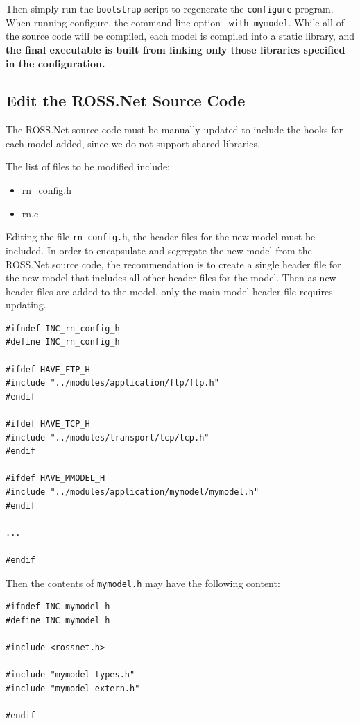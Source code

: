 \documentclass[conference,onecolumn]{IEEEtran}
\begin{document}
Then simply run the {\tt bootstrap} script to regenerate the {\tt configure} program.  When running configure, the command line option {\tt --with-mymodel}. While all of the source code will be compiled, each model is compiled into a static library, and {\bf the final executable is built from linking only those libraries specified in the configuration.}

\subsection{Edit the ROSS.Net Source Code}

The ROSS.Net source code must be manually updated to include the hooks for each model added, since we do not support shared libraries.  

The list of files to be modified include:

\begin{itemize}
  \item rn\_config.h
  \item rn.c
\end{itemize}

Editing the file {\tt rn\_config.h}, the header files for the new model must be included.  In order to encapsulate and segregate the new model from the ROSS.Net source code, the recommendation is to create a single header file for the new model that includes all other header files for the model.  Then as new header files are added to the model, only the main model header file requires updating.

\begin{small}\begin{verbatim}
#ifndef INC_rn_config_h
#define INC_rn_config_h

#ifdef HAVE_FTP_H
#include "../modules/application/ftp/ftp.h"
#endif

#ifdef HAVE_TCP_H
#include "../modules/transport/tcp/tcp.h"
#endif

#ifdef HAVE_MMODEL_H
#include "../modules/application/mymodel/mymodel.h"
#endif

...

#endif
\end{verbatim}\end{small}

Then the contents of {\tt mymodel.h} may have the following content:

\begin{small}\begin{verbatim}
#ifndef INC_mymodel_h
#define INC_mymodel_h

#include <rossnet.h>

#include "mymodel-types.h"
#include "mymodel-extern.h"

#endif
\end{verbatim}\end{small}
\end{document}

